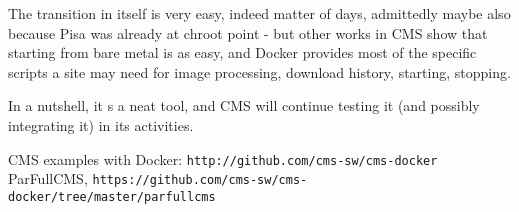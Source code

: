 \documentclass{PoS}
\begin{document}
The transition in itself is very easy, indeed matter of days, admittedly maybe also because Pisa was already at chroot point - but other works in CMS show that starting from bare metal is as easy,    and Docker provides most of the specific scripts a site may need for image processing, download history, starting, stopping.

In a nutshell, it s a neat tool, and CMS will continue testing it (and possibly integrating it) in its activities.

%


\begin{thebibliography}{99}
 CMS examples with Docker: \texttt{http://github.com/cms-sw/cms-docker}
 ParFullCMS, \texttt{https://github.com/cms-sw/cms-docker/tree/master/parfullcms}




\end{thebibliography}
\end{document}
